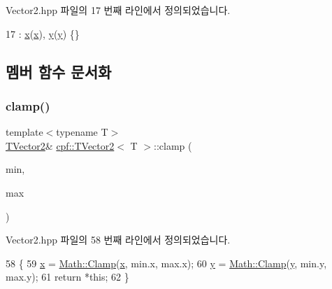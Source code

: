 Vector2.\+hpp 파일의 17 번째 라인에서 정의되었습니다.


\begin{DoxyCode}
17 : \hyperlink{classcpf_1_1_t_vector2_a2c0ac9258353351f1435070a2307e9e1}{x}(\hyperlink{classcpf_1_1_t_vector2_a2c0ac9258353351f1435070a2307e9e1}{x}), \hyperlink{classcpf_1_1_t_vector2_a727b923b39a876bbb13c810bcf6eecff}{y}(\hyperlink{classcpf_1_1_t_vector2_a727b923b39a876bbb13c810bcf6eecff}{y}) \{\}
\end{DoxyCode}


\subsection{멤버 함수 문서화}
\mbox{\label{classcpf_1_1_t_vector2_aef9e1a0af01a26c62f6fcb7de363e428}} 
\subsubsection{\texorpdfstring{clamp()}{clamp()}}
{\footnotesize\ttfamily template$<$typename T$>$ \\
\hyperlink{classcpf_1_1_t_vector2}{T\+Vector2}\& \hyperlink{classcpf_1_1_t_vector2}{cpf\+::\+T\+Vector2}$<$ T $>$\+::clamp (\begin{DoxyParamCaption}\item[{\hyperlink{classcpf_1_1_t_vector2}{T\+Vector2}$<$ T $>$}]{min,  }\item[{\hyperlink{classcpf_1_1_t_vector2}{T\+Vector2}$<$ T $>$}]{max }\end{DoxyParamCaption})\hspace{0.3cm}{\ttfamily [inline]}}



Vector2.\+hpp 파일의 58 번째 라인에서 정의되었습니다.


\begin{DoxyCode}
58                                                     \{
59             \hyperlink{classcpf_1_1_t_vector2_a2c0ac9258353351f1435070a2307e9e1}{x} = \hyperlink{classcpf_1_1_math_af254e4be01c64cf73906a0edf3c091e2}{Math::Clamp}(\hyperlink{classcpf_1_1_t_vector2_a2c0ac9258353351f1435070a2307e9e1}{x}, min.x, max.x);
60             \hyperlink{classcpf_1_1_t_vector2_a727b923b39a876bbb13c810bcf6eecff}{y} = \hyperlink{classcpf_1_1_math_af254e4be01c64cf73906a0edf3c091e2}{Math::Clamp}(\hyperlink{classcpf_1_1_t_vector2_a727b923b39a876bbb13c810bcf6eecff}{y}, min.y, max.y);
61             \textcolor{keywordflow}{return} *\textcolor{keyword}{this};
62         \}
\end{DoxyCode}
\mbox{\label{classcpf_1_1_t_vector2_adf4c70b4e511d0c816e47b52956d1fa2}} 
